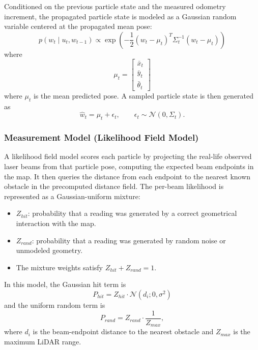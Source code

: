 \documentclass[11pt]{article}
\begin{document}
\noindent Conditioned on the previous particle state and the measured odometry increment, the propagated particle state
          is modeled as a Gaussian random variable centered at the propagated mean pose:
\begin{equation*}
p(w_t \mid u_t, w_{t-1}) \propto
\exp\left(
-\frac{1}{2}(w_t-\mu_t)^T \Sigma_t^{-1}(w_t-\mu_t)
\right)
\end{equation*}
where
\[
\mu_t =
\begin{bmatrix}
\bar{x}_t\\
\bar{y}_t\\
\bar{\theta}_t
\end{bmatrix}
\]
\noindent where \(\mu_t\) is the mean predicted pose. A sampled particle state is then generated as
\begin{equation*}
\hat{w}_t = \mu_t + \epsilon_t,
\qquad
\epsilon_t \sim \mathcal{N}(0,\Sigma_t).
\end{equation*}

\subsubsection{Measurement Model (Likelihood Field Model)}

\noindent A likelihood field model scores each particle by projecting the real-life observed laser beams from that particle pose,
          computing the expected beam endpoints in the map. It then queries the distance from each endpoint to the nearest
          known obstacle in the precomputed distance field. The per-beam likelihood is represented as a Gaussian-uniform
          mixture:

\begin{itemize}
    \item \(Z_{hit}\): probability that a reading was generated by a correct geometrical interaction with the map.
    \item \(Z_{rand}\): probability that a reading was generated by random noise or unmodeled geometry.
    \item The mixture weights satisfy \(Z_{hit} + Z_{rand} = 1\).
\end{itemize}

\noindent In this model, the Gaussian hit term is
\[
P_{hit} = Z_{hit} \cdot \mathcal{N}(d_i;0,\sigma^2)
\]
\noindent and the uniform random term is
\[
P_{rand} = Z_{rand} \cdot \frac{1}{Z_{max}},
\]
\noindent where \(d_i\) is the beam-endpoint distance to the nearest obstacle and \(Z_{max}\) is the maximum LiDAR
          range.
\end{document}
